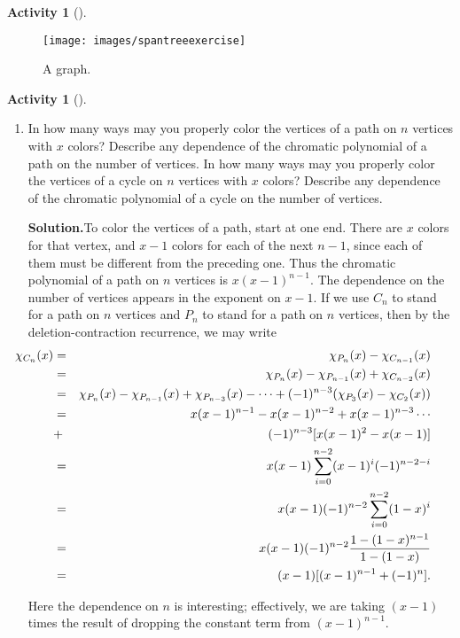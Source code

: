 \documentclass[10pt,]{book}
\theoremstyle{plain}
\theoremstyle{definition}
\newtheorem{activity}[project]{Activity}
\numberwithin{equation}{chapter}
\newcommand{\amp}{&}
\begin{document}
\begin{activity}[]
\begin{enumerate}[label=(\alph*)]
\end{enumerate}
\begin{figure}
\centering
\texttt{[image: images/spantreeexercise]}
\caption{A graph.\label{del-cont}}
\end{figure}
\end{activity}
\begin{activity}[]\label{activity-224}
~\par
\begin{enumerate}[label=(\alph*)]
 \item In how many ways may you properly color the vertices of a path on \(n\) vertices with \(x\) colors? Describe any dependence of the chromatic polynomial of a path on the number of vertices. In how many ways may you properly color the vertices of a cycle on \(n\) vertices with \(x\) colors? Describe any dependence of the chromatic polynomial of a cycle on the number of vertices.%
\par\medskip\noindent%
\textbf{Solution.}\quad To color the vertices of a path, start at one end. There are \(x\) colors for that vertex, and \(x-1\) colors for each of the next \(n-1\), since each of them must be different from the preceding one. Thus the chromatic polynomial of a path on \(n\) vertices is \(x(x-1)^{n-1}\). The dependence on the number of vertices appears in the exponent on \(x-1\). If we use \(C_n\) to stand for a path on \(n\) vertices and \(P_n\) to stand for a path on \(n\) vertices, then by the deletion-contraction recurrence, we may write%
\begin{align*}
\hspace{-.4 in}\chi_{C_n}(x) \amp =\amp
\chi_{P_n}(x)-\chi_{C_{n-1}}(x)\\
\amp =\amp \chi_{P_n}(x)-\chi_{P_{n-1}}(x)+\chi_{C_{n-2}}(x)\\
\amp =\amp
\chi_{P_n}(x)-\chi_{P_{n-1}}(x)+\chi_{P_{n-3}}(x)-
\cdots+(-1)^{n-3}(\chi_{P_3}(x)-\chi_{C_2}(x))\\
\amp =\amp x(x-1)^{n-1}-x(x-1)^{n-2}+x(x-1)^{n-3}\cdots\\
\amp +\amp (-1)^{n-3}[x(x-1)^2-x(x-1)]\\
\amp =\amp x(x-1)\sum_{i=0}^{n-2}(x-1)^i(-1)^{n-2-i}\\
\amp =\amp x(x-1)(-1)^{n-2}\sum_{i=0}^{n-2}(1-x)^i\\
\amp =\amp x(x-1)(-1)^{n-2}{1-(1-x)^{n-1}\over 1-(1-x)}\\
\amp =\amp (x-1)[(x-1)^{n-1}+(-1)^n].
\end{align*}
%
\par
Here the dependence on \(n\) is interesting; effectively, we are taking \((x-1)\) times the result of dropping the constant term from \((x-1)^{n-1}\).%


\end{enumerate}
\end{activity}
\end{document}
